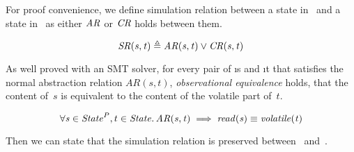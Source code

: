 For proof convenience, we define simulation relation between a state in \ProgInvState\ and a state in \SpecState\ as either $\mathit{AR}$ or $\mathit{CR}$ holds between them.
\begin{definition}
    $$\mathit{SR(s, t)} {}\triangleq{} \mathit{AR(s, t)} \lor \mathit{CR(s, t)}$$
\end{definition}
As well proved with an SMT solver, for every pair of \i{s \in \ProgInvState} and \i{t \in \SpecState} that satisfies the normal abstraction relation $AR(s,t)$, \emph{observational equivalence} holds, that the content of~$s$ is equivalent to the content of the volatile part of~$t$.
\begin{assumption}\label{ObsEquiv}
	$$
	 \forall \mathit{s} \in \mathit{State}^P,t \in \mathit{State} \ldotp
	 \mathit{AR(s, t)} \implies \mathit{read(s)} \equiv \mathit{volatile(t)}
	$$
\end{assumption}

Then we can state that the simulation relation is preserved between \Prog\ and~\Spec. 

